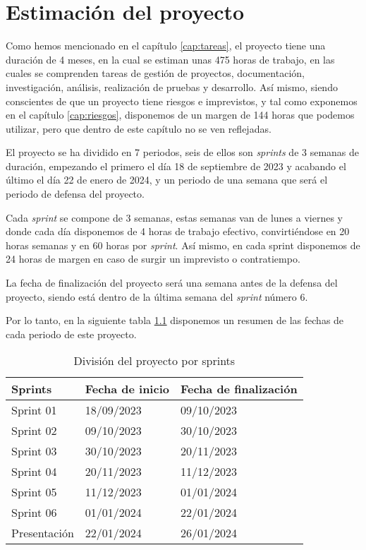 \chapter{Estimación del proyecto}
\label{cap:estimacion}


Como hemos mencionado en el capítulo \ref{cap:tareas}, el proyecto tiene una duración de 4 meses, en la cual se estiman unas 475 horas de trabajo, en las cuales se
comprenden tareas de gestión de proyectos, documentación, investigación, análisis, realización de pruebas y desarrollo. Así mismo, siendo conscientes de que un proyecto
tiene riesgos e imprevistos, y tal como exponemos en el capítulo \ref{cap:riesgos}, disponemos de un margen de 144 horas que podemos utilizar, pero que dentro de este
capítulo no se ven reflejadas.

El proyecto se ha dividido en 7 periodos, seis de ellos son \textit{sprints} de 3 semanas de duración, empezando el primero el día 18 de septiembre de 2023 y acabando el último
el día 22 de enero de 2024, y un periodo de una semana que será el periodo de defensa del proyecto.

Cada \textit{sprint} se compone de 3 semanas, estas semanas van de lunes a viernes y donde cada día disponemos de 4 horas de trabajo efectivo, convirtiéndose en 20 horas semanas
y en 60 horas por \textit{sprint}. Así mismo, en cada sprint disponemos de 24 horas de margen en caso de surgir un imprevisto o contratiempo.

La fecha de finalización del proyecto será una semana antes de la defensa del proyecto, siendo está dentro de la última semana del \textit{sprint} número 6.

Por lo tanto, en la siguiente tabla \ref{tab:proyecto_estimacion} disponemos un resumen de las fechas de cada periodo de este proyecto.

\begin{table}[H]
    \centering
    \begin{tabular}{|l|l|l|}
    \hline
    \rowcolor[HTML]{8EA9D8} 
    Sprints      & Fecha de inicio & Fecha de finalización \\ \hline
    Sprint 01    & 18/09/2023      & 09/10/2023            \\ \hline
    Sprint 02    & 09/10/2023      & 30/10/2023            \\ \hline
    Sprint 03    & 30/10/2023      & 20/11/2023            \\ \hline
    Sprint 04    & 20/11/2023      & 11/12/2023            \\ \hline
    Sprint 05    & 11/12/2023      & 01/01/2024            \\ \hline
    Sprint 06    & 01/01/2024      & 22/01/2024            \\ \hline
    Presentación & 22/01/2024      & 26/01/2024            \\ \hline
    \end{tabular}
    \caption{División del proyecto por sprints}
    \label{tab:proyecto_estimacion}
\end{table}

